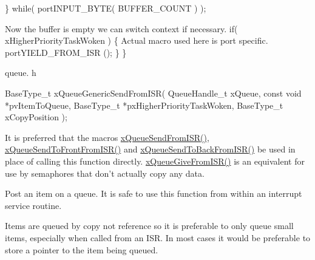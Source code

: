 \begin{DoxyPre}    \} while( portINPUT\_BYTE( BUFFER\_COUNT ) );\end{DoxyPre}



\begin{DoxyPre}Now the buffer is empty we can switch context if necessary.
    if( xHigherPriorityTaskWoken )
    \{
Actual macro used here is port specific.
        portYIELD\_FROM\_ISR ();
    \}
 \}
 \end{DoxyPre}


queue. h 
\begin{DoxyPre}
 BaseType\_t xQueueGenericSendFromISR(
                                           QueueHandle\_t        xQueue,
                                           const    void    *pvItemToQueue,
                                           BaseType\_t   *pxHigherPriorityTaskWoken,
                                           BaseType\_t   xCopyPosition
                                       );
 \end{DoxyPre}


It is preferred that the macros \hyperlink{queue_8h_a21d5919ed26c21d121df4a4debeb643c}{x\-Queue\-Send\-From\-I\-S\-R()}, \hyperlink{queue_8h_af03b83396462affe9e28302660e7b9c6}{x\-Queue\-Send\-To\-Front\-From\-I\-S\-R()} and \hyperlink{queue_8h_a51e9f73417b11441a181cdc4f33a68e9}{x\-Queue\-Send\-To\-Back\-From\-I\-S\-R()} be used in place of calling this function directly. \hyperlink{queue_8h_ad14ae1174c2772cffc9e0c2c45dc55a6}{x\-Queue\-Give\-From\-I\-S\-R()} is an equivalent for use by semaphores that don't actually copy any data.

Post an item on a queue. It is safe to use this function from within an interrupt service routine.

Items are queued by copy not reference so it is preferable to only queue small items, especially when called from an I\-S\-R. In most cases it would be preferable to store a pointer to the item being queued.



